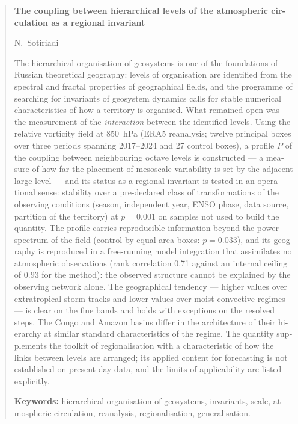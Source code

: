 \documentclass[11pt,a4paper]{article}
\newenvironment{englishblock}{\begin{otherlanguage}{english}}{\end{otherlanguage}}
\newenvironment{englishblock}{\begin{english}}{\end{english}}
\begin{document}
\begin{englishblock}
\begin{abstract}
\noindent\textbf{The coupling between hierarchical levels of the atmospheric circulation as a
regional invariant}

\smallskip\noindent N.~Sotiriadi

\smallskip\noindent The hierarchical organisation of geosystems is one of the foundations of Russian
theoretical geography: levels of organisation are identified from the spectral and fractal properties
of geographical fields, and the programme of searching for invariants of geosystem dynamics calls for
stable numerical characteristics of how a territory is organised. What remained open was the
measurement of the \emph{interaction} between the identified levels. Using the relative vorticity
field at 850~hPa (ERA5 reanalysis; twelve principal boxes over three periods spanning 2017--2024 and
27 control boxes), a profile $P$ of the coupling between neighbouring octave levels is constructed ---
a measure of how far the placement of mesoscale variability is set by the adjacent large level --- and
its status as a regional invariant is tested in an operational sense: stability over a pre-declared
class of transformations of the observing conditions (season, independent year, ENSO phase, data
source, partition of the territory) at $p=0.001$ on samples not used to build the quantity. The
profile carries reproducible information beyond the power spectrum of the field (control by
equal-area boxes: $p=0.033$), and its geography is reproduced in a free-running model integration
that assimilates no atmospheric observations (rank correlation 0.71 against an internal ceiling of
0.93 for the method): the observed structure cannot be explained by the observing network alone. The
geographical tendency --- higher values over extratropical storm tracks and lower values over
moist-convective regimes --- is clear on the fine bands and holds with exceptions on the resolved
steps. The Congo and Amazon basins differ in the architecture of their hierarchy at similar standard
characteristics of the regime. The quantity supplements the toolkit of regionalisation with a
characteristic of how the links between levels are arranged; its applied content for forecasting is
not established on present-day data, and the limits of applicability are listed explicitly.

\smallskip
\noindent\textbf{Keywords:} hierarchical organisation of geosystems, invariants, scale, atmospheric
circulation, reanalysis, regionalisation, generalisation.
\end{abstract}
\end{englishblock}
\end{document}
